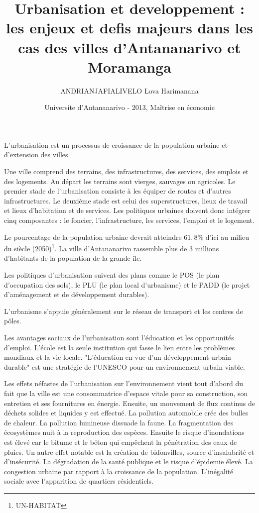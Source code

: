 \documentclass[11pt]{article}
\title{Urbanisation et developpement : les enjeux et defis majeurs dans les cas des villes d'Antananarivo et Moramanga}
\author{ANDRIANJAFIALIVELO Lova Harimanana}
\date{Universite d’Antananarivo - 2013, Maîtrise en économie}
\begin{document}
\maketitle

L'urbanisation est un processus de croissance de la population urbaine et d'extension des villes.

Une ville comprend des terrains, des infrastructures, des services, des emplois et des logements. 
Au départ les terrains sont vierges, sauvages ou agricoles. Le premier stade de l'urbanisation consiste à les équiper de routes et d'autres infrastructures. Le deuxième stade est celui des superstructures, lieux de travail et lieux d'habitation et de services.
Les politiques urbaines doivent donc intégrer cinq composantes : le foncier, l'infrastructure, les services, l'emploi et le logement.

Le pourcentage de la population urbaine devrait atteindre $61,8\%$ d'ici au milieu du siècle (2050)\footnote{UN-HABITAT}. La ville d'Antananarivo rassemble plus de 3 millions d'habitants de la population de la grande île.

Les politiques d'urbanisation suivent des plans comme le POS (le plan d'occupation des sols), le PLU (le plan local d'urbanisme) et le PADD (le projet d'aménagement et de développement durables).

L'urbanisme s'appuie généralement sur le réseau de transport et les centres de pôles.

Les avantages sociaux de l'urbanisation sont l'éducation et les opportunités d'emploi.
L'école est la seule institution qui fasse le lien entre les problèmes mondiaux et la vie locale. "L'éducation en vue d'un développement urbain durable" est une stratégie de l'UNESCO pour un environnement urbain viable.

Les effets néfastes de l'urbanisation sur l'environnement vient tout d'abord du fait que la ville est une consommatrice d'espace vitale pour sa construction, son entretien et ses fournitures en énergie. Ensuite, un mouvement de flux continus de déchets solides et liquides y est effectué. La pollution automobile crée des bulles de chaleur. La pollution lumineuse dissuade la faune. La fragmentation des écosystèmes nuit à la reproduction des espèces. Ensuite le risque d'inondations est élevé car le bitume et le béton  qui empêchent la pénétration des eaux de pluies. 
Un autre effet notable est la création de bidonvilles, source d'insalubrité et d'insécurité. La dégradation de la santé publique et le risque d'épidemie élevé.
La congestion urbaine par rapport à la croissance de la population.
L'inégalité sociale avec l'apparition de quartiers résidentiels.
\end{document}
